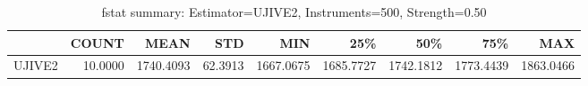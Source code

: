 \begin{table}[ht]
\centering
\caption{fstat summary: Estimator=UJIVE2, Instruments=500, Strength=0.50}
\begin{tabular}{lrrrrrrrr}
\toprule
 & COUNT & MEAN & STD & MIN & 25\% & 50\% & 75\% & MAX \\
\midrule
UJIVE2 & 10.0000 & 1740.4093 & 62.3913 & 1667.0675 & 1685.7727 & 1742.1812 & 1773.4439 & 1863.0466 \\
\bottomrule
\end{tabular}
\end{table}
